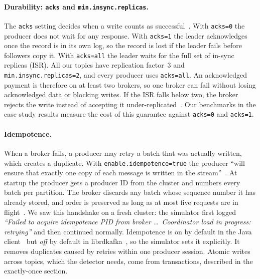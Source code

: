\paragraph{Durability: \texttt{acks} and \texttt{min.insync.replicas}.}
The \texttt{acks} setting decides when a write counts as successful~\cite{kafka-producer-configs}. With \texttt{acks=0} the producer does not wait for any response. With \texttt{acks=1} the leader acknowledges once the record is in its own log, so the record is lost if the leader fails before followers copy it. With \texttt{acks=all} the leader waits for the full set of in-sync replicas (ISR). All our topics have replication factor~3 and \texttt{min.insync.replicas=2}, and every producer uses \texttt{acks=all}. An acknowledged payment is therefore on at least two brokers, so one broker can fail without losing acknowledged data or blocking writes. If the ISR falls below two, the broker rejects the write instead of accepting it under-replicated~\cite{librdkafka-config}. Our benchmarks in the case study results measure the cost of this guarantee against \texttt{acks=0} and \texttt{acks=1}.

\paragraph{Idempotence.}
When a broker fails, a producer may retry a batch that was actually written, which creates a duplicate. With \texttt{enable.idempotence=true} the producer ``will ensure that exactly one copy of each message is written in the stream''~\cite{kafka-producer-configs}. At startup the producer gets a producer ID from the cluster and numbers every batch per partition. The broker discards any batch whose sequence number it has already stored, and order is preserved as long as at most five requests are in flight~\cite{shapira2021, kafka-producer-configs}. We saw this handshake on a fresh cluster: the simulator first logged \emph{``Failed to acquire idempotence PID from broker \dots\ Coordinator load in progress: retrying''} and then continued normally. Idempotence is on by default in the Java client~\cite{kafka-producer-configs} but \emph{off} by default in librdkafka~\cite{librdkafka-config}, so the simulator sets it explicitly. It removes duplicates caused by retries within one producer session. Atomic writes across topics, which the detector needs, come from transactions, described in the exactly-once section.

